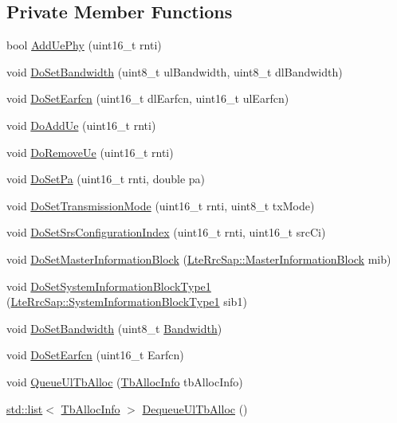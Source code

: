 \subsection*{Private Member Functions}
\begin{DoxyCompactItemize}
\item 
bool \hyperlink{classns3_1_1MmWaveEnbPhy_ad1cc745b4aad6c2077f6598d827c1740}{Add\+Ue\+Phy} (uint16\+\_\+t rnti)
\item 
void \hyperlink{classns3_1_1MmWaveEnbPhy_a5b4b493cc750cc598a49852f012b8d95}{Do\+Set\+Bandwidth} (uint8\+\_\+t ul\+Bandwidth, uint8\+\_\+t dl\+Bandwidth)
\item 
void \hyperlink{classns3_1_1MmWaveEnbPhy_a228a4c97ff1357f6fa0bff3b81d1a33f}{Do\+Set\+Earfcn} (uint16\+\_\+t dl\+Earfcn, uint16\+\_\+t ul\+Earfcn)
\item 
void \hyperlink{classns3_1_1MmWaveEnbPhy_abb736ddd1a3a4810a9ed33e7a99c6513}{Do\+Add\+Ue} (uint16\+\_\+t rnti)
\item 
void \hyperlink{classns3_1_1MmWaveEnbPhy_a6e36e4633558135ae94c57b16de486c7}{Do\+Remove\+Ue} (uint16\+\_\+t rnti)
\item 
void \hyperlink{classns3_1_1MmWaveEnbPhy_a1ad1c792c6d7e2d8646f2f6685cd7b50}{Do\+Set\+Pa} (uint16\+\_\+t rnti, double pa)
\item 
void \hyperlink{classns3_1_1MmWaveEnbPhy_af67807cf040619075d5341c7dacd022e}{Do\+Set\+Transmission\+Mode} (uint16\+\_\+t rnti, uint8\+\_\+t tx\+Mode)
\item 
void \hyperlink{classns3_1_1MmWaveEnbPhy_ae59957c3903e04236f2dc667ccd028a6}{Do\+Set\+Srs\+Configuration\+Index} (uint16\+\_\+t rnti, uint16\+\_\+t src\+Ci)
\item 
void \hyperlink{classns3_1_1MmWaveEnbPhy_a660c7782964037643f9e600e494d7ec7}{Do\+Set\+Master\+Information\+Block} (\hyperlink{structns3_1_1LteRrcSap_1_1MasterInformationBlock}{Lte\+Rrc\+Sap\+::\+Master\+Information\+Block} mib)
\item 
void \hyperlink{classns3_1_1MmWaveEnbPhy_a0993d57b331351f6cd6e4de0ef1557a1}{Do\+Set\+System\+Information\+Block\+Type1} (\hyperlink{structns3_1_1LteRrcSap_1_1SystemInformationBlockType1}{Lte\+Rrc\+Sap\+::\+System\+Information\+Block\+Type1} sib1)
\item 
void \hyperlink{classns3_1_1MmWaveEnbPhy_a9536f7eba5206318b4108d847a5fbc4e}{Do\+Set\+Bandwidth} (uint8\+\_\+t \hyperlink{lte__link__budget__x2__handover__measures_8m_aeca2567c1a41f6306bac61b92ea168d2}{Bandwidth})
\item 
void \hyperlink{classns3_1_1MmWaveEnbPhy_a196647c1f755d612aa522e4bfbdb3f0d}{Do\+Set\+Earfcn} (uint16\+\_\+t Earfcn)
\item 
void \hyperlink{classns3_1_1MmWaveEnbPhy_a1ac1030adc34dca45fd6b7ea43af609a}{Queue\+Ul\+Tb\+Alloc} (\hyperlink{structns3_1_1TbAllocInfo}{Tb\+Alloc\+Info} tb\+Alloc\+Info)
\item 
\hyperlink{openflow-interface_8h_afd9bcfa176617760671b67580f536fa7}{std\+::list}$<$ \hyperlink{structns3_1_1TbAllocInfo}{Tb\+Alloc\+Info} $>$ \hyperlink{classns3_1_1MmWaveEnbPhy_a5c16587c7d19a6c22f77b85e025a9262}{Dequeue\+Ul\+Tb\+Alloc} ()
\end{DoxyCompactItemize}
